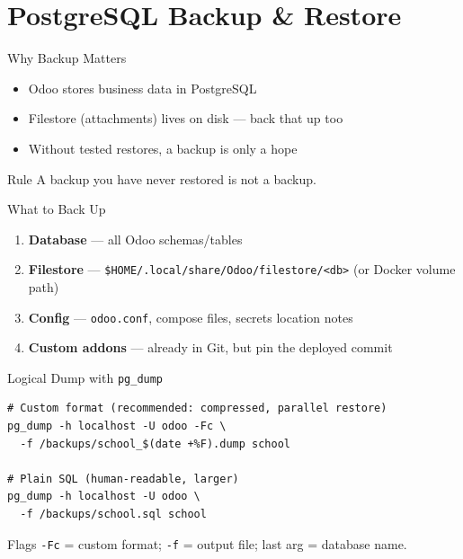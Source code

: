\section{PostgreSQL Backup \& Restore}

\begin{frame}{Why Backup Matters}
\begin{itemize}
  \item Odoo stores business data in PostgreSQL
  \item Filestore (attachments) lives on disk --- back that up too
  \item Without tested restores, a backup is only a hope
\end{itemize}

\vspace{0.5em}
\begin{alertblock}{Rule}
  A backup you have never restored is not a backup.
\end{alertblock}
\end{frame}

\begin{frame}{What to Back Up}
\begin{enumerate}
  \item \textbf{Database} --- all Odoo schemas/tables
  \item \textbf{Filestore} --- \texttt{\$HOME/.local/share/Odoo/filestore/<db>}
       (or Docker volume path)
  \item \textbf{Config} --- \texttt{odoo.conf}, compose files, secrets location notes
  \item \textbf{Custom addons} --- already in Git, but pin the deployed commit
\end{enumerate}
\end{frame}

\begin{frame}[fragile]{Logical Dump with \texttt{pg\_dump}}
\begin{lstlisting}[style=bash]
# Custom format (recommended: compressed, parallel restore)
pg_dump -h localhost -U odoo -Fc \
  -f /backups/school_$(date +%F).dump school

# Plain SQL (human-readable, larger)
pg_dump -h localhost -U odoo \
  -f /backups/school.sql school
\end{lstlisting}

\vspace{0.4em}
\begin{block}{Flags}
  \texttt{-Fc} = custom format; \texttt{-f} = output file; last arg = database name.
\end{block}
\end{frame}

